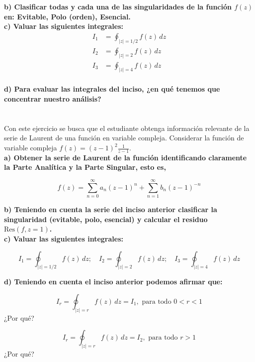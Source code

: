 \documentclass[12pt]{report}
\begin{document}
\textbf{b) Clasificar todas y cada una de las singularidades de la función $f(z)$ en: Evitable, Polo (orden), Esencial.}\\[6pt]

\textbf{c) Valuar las siguientes integrales:}\\[6pt]
\begin{align*}
    I_1 &= \oint_{|z|=1/2} f(z) \, dz \\[6pt]
    I_2 &= \oint_{|z|=2} f(z) \, dz \\[6pt]
    I_3 &= \oint_{|z|=4} f(z) \, dz\\[6pt]
\end{align*}

\textbf{d) Para evaluar las integrales del inciso, ¿en qué tenemos que concentrar nuestro análisis?}

\chapter{}

Con este ejercicio se busca que el estudiante obtenga información relevante de la serie de Laurent de una función en variable compleja.
Considerar la función de variable compleja \( f(z) = (z - 1)^2 \frac{1}{z - 1} \).\\[6pt]

\textbf{a)  Obtener la serie de Laurent de la función identificando claramente la Parte Analítica y la Parte Singular, esto es,}

$$ f(z) = \sum_{n=0}^{\infty} a_n(z - 1)^n + \sum_{n=1}^{\infty} b_n(z - 1)^{-n} $$

\textbf{b)  Teniendo en cuenta la serie del inciso anterior clasificar la singularidad (evitable, polo, esencial) y calcular el residuo \( \text{Res}(f, z = 1) \).}\\[6pt]

\textbf{c)  Valuar las siguientes integrales:}

$$ I_1 = \oint_{|z| = 1/2} f(z) \, dz; \quad I_2 = \oint_{|z| = 2} f(z) \, dz; \quad I_3 = \oint_{|z| = 4} f(z) \, dz $$

\textbf{d)  Teniendo en cuenta el inciso anterior podemos afirmar que:}

$$ I_r = \oint_{|z| = r} f(z) \, dz = I_1, \text{ para todo } 0 < r < 1 $$ ¿Por qué?

$$ I_r = \oint_{|z| = r} f(z) \, dz = I_2, \text{ para todo } r > 1 $$ ¿Por qué?

\chapter{}
\end{document}
